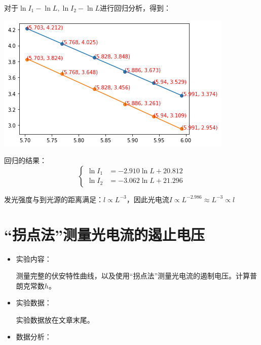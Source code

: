 \documentclass[a4paper]{ltxdoc}
\newenvironment{Figure}
  {\par\medskip\noindent\minipage{\linewidth}}
  {\endminipage\par\medskip}
\begin{document}
\begin{multicols}{2}
\begin{itemize}
              对于$\ln I_1 - \ln L,\ln I_2 - \ln L$进行回归分析，得到：
              \begin{Figure}
                  \centering
                  \includegraphics[width=\linewidth]{6.png}
              \end{Figure}
              回归的结果：
              $$
                  \left\{
                  \begin{aligned}
                      \ln I_1 & = -2.910 \ln L + 20.812 \\
                      \ln I_2 & = -3.062 \ln L + 21.296
                  \end{aligned}
                  \right.
              $$

              发光强度与到光源的距离满足：$l \propto L^{-3}$，因此光电流$I \propto L^{-2.986} \approx L^{-3} \propto l$
    \end{itemize}
    \section{“拐点法”测量光电流的遏止电压}
    \begin{itemize}
        \item 实验内容：

              测量完整的伏安特性曲线，以及使用“拐点法”测量光电流的遏制电压。计算普朗克常数$h$。

        \item 实验数据：

              实验数据放在文章末尾。

        \item 数据分析：


\end{itemize}
\end{multicols}
\end{document}
